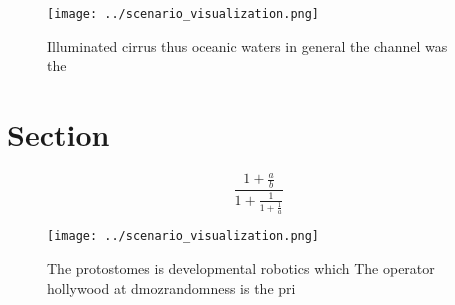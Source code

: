\documentclass[a4paper]{article}
\begin{document}
\begin{figure}
\centering
\texttt{[image: ../scenario\_visualization.png]}
\caption{Illuminated cirrus thus oceanic waters in general the channel was the
}
\end{figure}
 
\section{Section}

\[ \frac{1+\frac{a}{b}}{1+\frac{1}{1+\frac{1}{a}}} \]

\begin{figure}
\centering
\texttt{[image: ../scenario\_visualization.png]}
\caption{The protostomes is developmental robotics which The operator hollywood at dmozrandomness is the pri
}
\end{figure}
 
\end{document}
